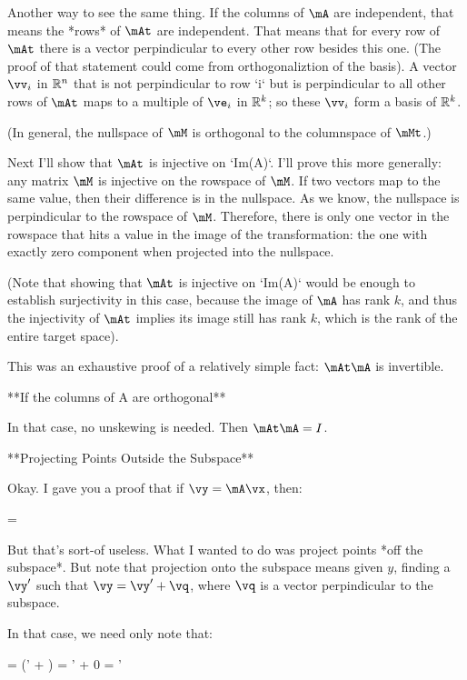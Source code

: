 Another way to see the same thing. If the columns of $\mA$ are
independent, that means the *rows* of $\mAt$ are independent. That
means that for every row of $\mAt$ there is a vector perpindicular
to every other row besides this one. (The proof of that statement
could come from orthogonaliztion of the basis). A vector $\vv_i$ in
$\mathbb{R}^n$ that is not perpindicular to row `i` but is perpindicular to all
other rows of $\mAt$ maps to a multiple of $\ve_i$ in $\mathbb{R}^k$; so these
$\vv_i$ form a basis of $\mathbb{R}^k$.

(In general, the nullspace of $\mM$ is orthogonal to the columnspace of
$\mMt$.)

Next I'll show that $\mAt$ is injective on `Im(A)`. I'll prove this
more generally: any matrix $\mM$ is injective on the rowspace of $\mM$. If
two vectors map to the same value, then their difference is in the
nullspace. As we know, the nullspace is perpindicular to the rowspace
of $\mM$. Therefore, there is only one vector in the rowspace that hits
a value in the image of the transformation: the one with exactly zero
component when projected into the nullspace.

(Note that showing that $\mAt$ is injective on `Im(A)` would be
enough to establish surjectivity in this case, because the image of $\mA$
has rank $k$, and thus the injectivity of $\mAt$ implies its image
still has rank $k$, which is the rank of the entire target space).

This was an exhaustive proof of a relatively simple fact: $\mAt\mA$
is invertible.

**If the columns of A are orthogonal**

In that case, no unskewing is needed. Then $\mAt\mA=I$.

**Projecting Points Outside the Subspace**

Okay. I gave you a proof that if $\vy=\mA\vx$, then:

\begin{nedqn}
  \vx = \parensinv{\mAt \mA} \parens{\mAt \vy}
\end{nedqn}

But that's sort-of useless. What I wanted to do was project points *off
the subspace*. But note that projection onto the subspace means given
$y$, finding a $\vy'$ such that $\vy = \vy' + \vq$, where $\vq$ is a
vector perpindicular to the subspace.

In that case, we need only note that:

\begin{nedqn}
  \mAt \vy = \mAt (\vy' + \vq) = \mAt \vy' + 0 = \mAt \vy'
\end{nedqn}

